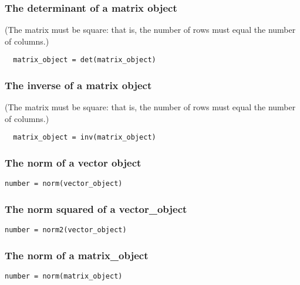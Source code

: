 \documentclass{admbmanual}
\begin{document}
\subsubsection{The determinant of a matrix object}

(The matrix must be square: that is, the number of rows must equal the number of
columns.)
\begin{lstlisting}
  matrix_object = det(matrix_object)
\end{lstlisting}

\subsubsection{The inverse of a matrix object}
(The matrix must be square: that is, the number of rows must equal the number of
columns.)
\begin{lstlisting}
  matrix_object = inv(matrix_object)
\end{lstlisting}

\subsubsection{The norm of a vector object}
\begin{lstlisting}
number = norm(vector_object)
\end{lstlisting}
\bigskip

\subsubsection{The norm squared of a vector\_object}
\begin{lstlisting}
number = norm2(vector_object)
\end{lstlisting}
\bigskip

\subsubsection{The norm of a matrix\_object}
\begin{lstlisting}
number = norm(matrix_object)
\end{lstlisting}
\bigskip
\end{document}
